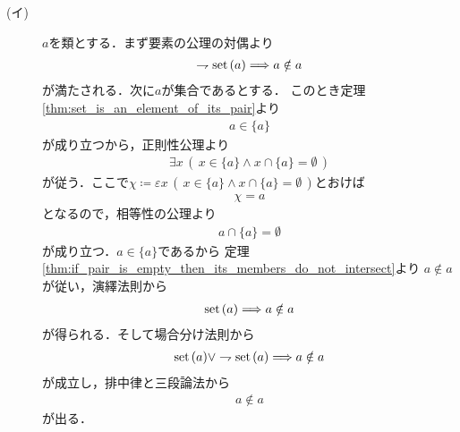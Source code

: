 	\begin{prf}\mbox{}
		\begin{description}
			\item[(イ)] $a$を類とする．まず要素の公理の対偶より
				\begin{align}
					\rightharpoondown \operatorname*{set}\hspace{0.15em}(a) \Longrightarrow a \notin a
				\end{align}
				が満たされる．次に$a$が集合であるとする．
				このとき定理\ref{thm:set_is_an_element_of_its_pair}より
				\begin{align}
					a \in \{a\}
				\end{align}
				が成り立つから，正則性公理より
				\begin{align}
					\exists x\, \left(\, x \in \{a\} \wedge x \cap \{a\} = \emptyset\, \right)
				\end{align}
				が従う．ここで$\chi \coloneqq \varepsilon x\, \left(\, x \in \{a\} \wedge x \cap \{a\} = \emptyset\, \right)$とおけば
				\begin{align}
					\chi = a
				\end{align}
				となるので，相等性の公理より
				\begin{align}
					a \cap \{a\} = \emptyset
				\end{align}
				が成り立つ．$a \in \{a\}$であるから
				定理\ref{thm:if_pair_is_empty_then_its_members_do_not_intersect}より
				$a \notin a$が従い，演繹法則から
				\begin{align}
					\operatorname*{set}\hspace{0.15em}(a) \Longrightarrow a \notin a
				\end{align}
				が得られる．そして場合分け法則から
				\begin{align}
					\operatorname*{set}\hspace{0.15em}(a) \vee \rightharpoondown \operatorname*{set}\hspace{0.15em}(a) \Longrightarrow a \notin a
				\end{align}
				が成立し，排中律と三段論法から
				\begin{align}
					a \notin a
				\end{align}
				が出る．
			

\end{description}
\end{prf}
